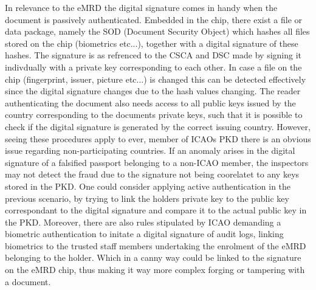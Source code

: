 \documentclass[12pt,
               a4paper,
               article,
               oneside,
               oldfontcommands,
               english]{memoir}
\begin{document}
In relevance to the eMRD the digital signature comes in handy when the document is passively authenticated. Embedded in the chip, there exist a file or data package, namely the SOD (Document Security Object) which hashes all files stored on the chip (biometrics etc...), together with a digital signature of these hashes. The signature is as refrenced to the CSCA and DSC made by signing it indivdually with a private key corresponding to each other. In case a file on the chip (fingerprint, issuer, picture etc...) is changed this can be detected effectively since the digital signature changes due to the hash values changing. The reader authenticating the document also needs access to all public keys  issued by the country corresponding to the documents private keys, such that it is possible to check if the digital signature is generated by the correct issuing country. However, seeing these procedures apply to ever, member of ICAOs PKD there is an obvious issue regarding non-participating countries. If an anomaly arises in the digital signature of a falsified passport belonging to a non-ICAO member, the inspectors may not detect the fraud due to the signature not being coorelatet to any keys stored in the PKD. One could consider applying active authentication in the previous scenario, by trying to link the holders private key to the public key correspondant to the digital signature and compare it to the actual public key in the PKD. Moreover, there are also rules stipulated by ICAO demanding a biometric authentication to initate a digital signature of audit logs, linking biometrics to the trusted staff members undertaking the enrolment of the eMRD belonging to the holder.\cite{ICAO_3} Which in a canny way could be linked to the signature on the eMRD chip, thus making it way more complex forging or tampering with a document. \vspace{4mm}\\
\end{document}
